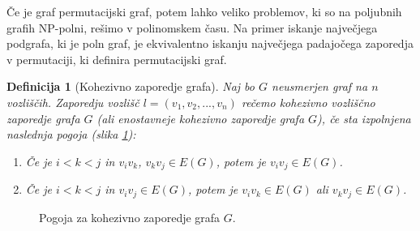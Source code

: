 \documentclass[a4paper, 12pt]{book}
\newtheorem{definicija}{Definicija}[chapter]
\begin{document}
Če je graf permutacijski graf, potem lahko veliko problemov, ki so na poljubnih grafih NP-polni, rešimo v polinomskem času. Na primer iskanje največjega podgrafa, ki je poln graf, je ekvivalentno iskanju največjega padajočega zaporedja v permutaciji, ki definira permutacijski graf.

\begin{definicija}[Kohezivno zaporedje grafa]
\label{def_kohezivno_zaporedje}
    Naj bo $G$ neusmerjen graf na $n$ vozliščih. 
    Zaporedju vozlišč $l = (v_1, v_2, ..., v_n)$ rečemo kohezivno vozliščno zaporedje grafa $G$ (ali enostavneje kohezivno zaporedje grafa $G$), če sta izpolnjena naslednja pogoja (slika \ref{graf_kohezivno_zaporedje_ab}):
    \begin{enumerate}[label=(\alph*)]
        \item Če je $i < k < j$ in $v_iv_k$, $v_kv_j \in E(G)$, potem je $v_iv_j \in E(G)$.
        \item Če je $i < k < j$ in $v_iv_j \in E(G)$, potem je $v_iv_k \in E(G)$ ali $v_kv_j \in E(G)$.
    \end{enumerate}
\end{definicija}

\begin{figure}[h]
    \begin{center}        
    \end{center}
    \caption{Pogoja za kohezivno zaporedje grafa $G$.}
    \label{graf_kohezivno_zaporedje_ab}
\end{figure}
\end{document}
